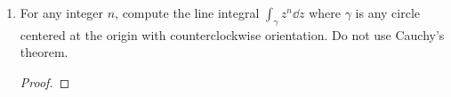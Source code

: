 \documentclass[../psets.tex]{subfiles}
\begin{document}
\begin{enumerate}[ref={A.\arabic*}]
\begin{proof}
        We have that
        \begin{align*}
            \frac{1}{2}[(z,w)+(w,z)] &= \frac{1}{2}[z\bar{w}+w\bar{z}]\\
            &= \frac{1}{2}[(z_1+iz_2)(w_1-iw_2)+(w_1+iw_2)(z_1-iz_2)]\\
            &= \frac{1}{2}[(z_1w_1+z_2w_2+i(z_2w_1-z_1w_2))+(w_1z_1+w_2z_2+i(w_2z_1-w_1z_2))]\\
            &= z_1w_1+z_2w_2\\
            &= \inp{(z_1,z_2),(w_1,w_2)}\\
            &= \inp{z,w}
        \end{align*}
        and
        \begin{align*}
            \re(z,w) &= \re(z\bar{w})\\
            &= \re[(z_1+iz_2)(w_1-iw_2)]\\
            &= \re[z_1w_1+z_2w_2+i(z_2w_1-z_1w_2)]\\
            &= z_1w_1+z_2w_2\\
            &= \inp{(z_1,z_2),(w_1,w_2)}\\
            &= \inp{z,w}
        \end{align*}
        as desired.
    \end{proof}
    \item \label{prb:1.A.3}For any integer $n$, compute the line integral $\int_\gamma z^n\dd{z}$ where $\gamma$ is any circle centered at the origin with counterclockwise orientation. Do not use Cauchy's theorem.
    \begin{proof}


\end{proof}
\end{enumerate}
\end{document}
